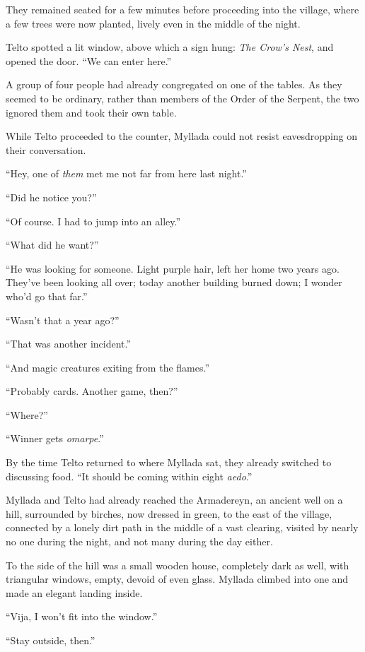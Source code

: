 They remained seated for a few minutes before proceeding into the village, where a few trees were now planted, lively even in the middle of the night.

Telto spotted a lit window, above which a sign hung: \emph{The Crow's Nest}, and opened the door. ``We can enter here.''

A group of four people had already congregated on one of the tables. As they seemed to be ordinary, rather than members of the Order of the Serpent, the two ignored them and took their own table.

While Telto proceeded to the counter, Myllada could not resist eavesdropping on their conversation.

``Hey, one of \emph{them} met me not far from here last night.''

``Did he notice you?''

``Of course. I had to jump into an alley.''

``What did he want?''

``He was looking for someone. Light purple hair, left her home two years ago. They've been looking all over; today another building burned down; I wonder who'd go that far.''

``Wasn't that a year ago?''

``That was another incident.''

``And magic creatures exiting from the flames.''

``Probably cards. Another game, then?''

``Where?''

``Winner gets \emph{omarpe}.''

By the time Telto returned to where Myllada sat, they already switched to discussing food. ``It should be coming within eight \emph{aedo}.''

\centeredstars

Myllada and Telto had already reached the Armadereyn, an ancient well on a hill, surrounded by birches, now dressed in green, to the east of the village, connected by a lonely dirt path in the middle of a vast clearing, visited by nearly no one during the night, and not many during the day either.

To the side of the hill was a small wooden house, completely dark as well, with triangular windows, empty, devoid of even glass. Myllada climbed into one and made an elegant landing inside.

``Vija, I won't fit into the window.''

``Stay outside, then.''

